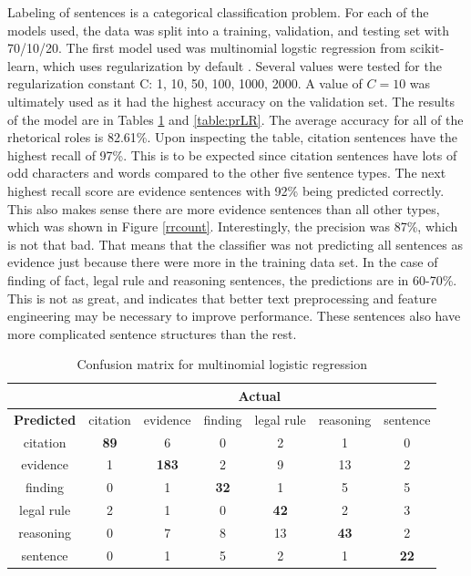 \documentclass[11pt]{article}
\begin{document}
Labeling of sentences is a categorical classification problem. For each of the models used, the data was split into a training, validation, and testing set with 70/10/20. The first model used was multinomial logstic regression from scikit-learn, which uses regularization by default \cite{scikit-learn}. Several values were tested for the regularization constant C: 1, 10, 50, 100, 1000, 2000. A value of $C=10$ was ultimately used as it had the highest accuracy on the validation set. The results of the model are in Tables \ref{table:LR} and \ref{table:prLR}. The average accuracy for all of the rhetorical roles is 82.61\%. Upon inspecting the table, citation sentences have the highest recall of 97\%. This is to be expected since citation sentences have lots of odd characters and words compared to the other five sentence types. The next highest recall score are evidence sentences with 92\% being predicted correctly. This also makes sense there are more evidence sentences than all other types, which was shown in Figure \ref{rrcount}. Interestingly, the precision was 87\%, which is not that bad. That means that the classifier was not predicting all sentences as evidence just because there were more in the training data set. In the case of finding of fact, legal rule and reasoning sentences, the predictions are in 60-70\%. This is not as great, and indicates that better text preprocessing and feature engineering may be necessary to improve performance. These sentences also have more complicated sentence structures than the rest.

\vspace{1.4em}
\begin{table}[h]
  \centering
  \begin{tabular}{| c| c| c| c| c| c| c|}
    \hline
    & \multicolumn{6}{|c|}{\textbf{Actual}} \\
    \hline
    \textbf{Predicted} & citation & evidence & finding & legal rule & reasoning & sentence \\
    \hline
    citation  & \textbf{89} &    6    &  0     &    2      &        1  &    0 \\ 
    evidence  &  1   & \textbf{183} &       2   &     9     &       13  &    2  \\
    finding   &    0   &    1    & \textbf{32}  &    1      &        5  &    5  \\
    legal rule &    2   &    1    &        0    & \textbf{42} &    2     &    3  \\
    reasoning &    0   &    7   &        8    &    13    &  \textbf{43} &   2  \\
    sentence  &    0   &   1    &        5     &    2   &         1     & \textbf{22}\\
    \hline
  \end{tabular}
  \caption{Confusion matrix for multinomial logistic regression}
  \label{table:LR}
\end{table}
\vspace{0.3em}
\end{document}
